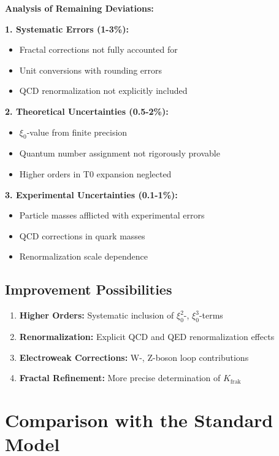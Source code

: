 \documentclass[12pt,a4paper]{article}
\begin{document}
	\begin{method}
		\textbf{Analysis of Remaining Deviations:}
		
		\textbf{1. Systematic Errors (1-3\%):}
		\begin{itemize}
			\item Fractal corrections not fully accounted for
			\item Unit conversions with rounding errors
			\item QCD renormalization not explicitly included
		\end{itemize}
		
		\textbf{2. Theoretical Uncertainties (0.5-2\%):}
		\begin{itemize}
			\item $\xi_0$-value from finite precision
			\item Quantum number assignment not rigorously provable
			\item Higher orders in T0 expansion neglected
		\end{itemize}
		
		\textbf{3. Experimental Uncertainties (0.1-1\%):}
		\begin{itemize}
			\item Particle masses afflicted with experimental errors
			\item QCD corrections in quark masses
			\item Renormalization scale dependence
		\end{itemize}
	\end{method}
	
	\subsection{Improvement Possibilities}
	
	\begin{enumerate}
		\item \textbf{Higher Orders:} Systematic inclusion of $\xi_0^2$-, $\xi_0^3$-terms
		\item \textbf{Renormalization:} Explicit QCD and QED renormalization effects
		\item \textbf{Electroweak Corrections:} W-, Z-boson loop contributions
		\item \textbf{Fractal Refinement:} More precise determination of $K_{\text{frak}}$
	\end{enumerate}
	
	\section{Comparison with the Standard Model}
	
\end{document}
